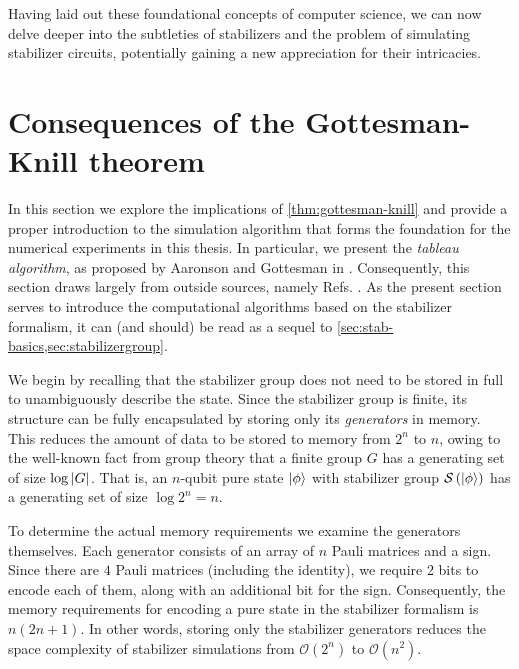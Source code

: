 Having laid out these foundational concepts of computer science, we can now
delve deeper into the subtleties of stabilizers and the problem of simulating
stabilizer circuits, potentially gaining a new appreciation for their
intricacies.

\section{Consequences of the Gottesman-Knill theorem}\label{sec:sim-stab}
In this section we explore the implications of \cref{thm:gottesman-knill} and
provide a proper introduction to the simulation algorithm that forms the
foundation for the numerical experiments in this thesis.  In particular, we
present the \emph{tableau algorithm}, as proposed by Aaronson and Gottesman in
\cite{aaronsonImprovedSimulationStabilizer2004}.  Consequently, this section
draws largely from outside sources, namely Refs.
\cite{aaronsonImprovedSimulationStabilizer2004, arabLectureNotesQuantum2024,
gottesmanStabilizerCodesQuantum1997,
gottesmanHeisenbergRepresentationQuantum1998}. As the present section serves
to introduce the computational algorithms based on the stabilizer formalism, it
can (and should) be read as a sequel to
\cref{sec:stab-basics,sec:stabilizergroup}.

We begin by recalling that the stabilizer group does not need to be stored in
full to unambiguously describe the state. Since the stabilizer group is finite,
its structure can be fully encapsulated by storing only its \emph{generators}
in memory. This reduces the amount of data to be stored to memory from $2^n$
to $n$, owing to the well-known fact from group theory that a finite group $G$
has a generating set of size $\log \abs{G}$. That is, an $n$-qubit pure state
$\ket{\phi}$ with stabilizer group $\mathcal{S}\left(\ket{\phi}\right)$ has a generating
set of size $\log 2^n = n$.

To determine the actual memory requirements we examine the generators
themselves.  Each generator consists of an array of $n$ Pauli matrices and a
sign. Since there are $4$ Pauli matrices (including the identity), we require 2
bits to encode each of them, along with an additional bit for the sign.
Consequently, the memory requirements for encoding a pure state in the
stabilizer formalism is $n(2n+1)$. In other words, storing only the stabilizer
generators reduces the space complexity of stabilizer simulations from
$\mathcal{O}\left( 2^n \right)$ to $\mathcal{O}\left( n^2 \right)$.

